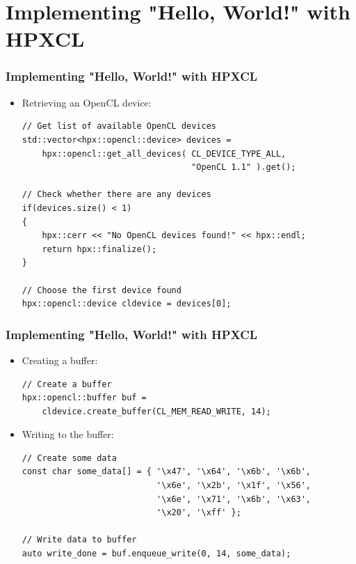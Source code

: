\documentclass{beamer}
\begin{document}

\section{Implementing "Hello, World!" with HPXCL}
\begin{frame}[fragile]
    \frametitle{Implementing "Hello, World!" with HPXCL}
    \begin{itemize}
        \item Retrieving an OpenCL device:
        \begin{lstlisting}[firstnumber=30]
// Get list of available OpenCL devices
std::vector<hpx::opencl::device> devices =
    hpx::opencl::get_all_devices( CL_DEVICE_TYPE_ALL,
                                  "OpenCL 1.1" ).get();

// Check whether there are any devices
if(devices.size() < 1)
{
    hpx::cerr << "No OpenCL devices found!" << hpx::endl;
    return hpx::finalize();
}

// Choose the first device found
hpx::opencl::device cldevice = devices[0];
        \end{lstlisting}
    \end{itemize}
\end{frame}

\begin{frame}[fragile]
    \frametitle{Implementing "Hello, World!" with HPXCL}
    \begin{itemize}
        \item Creating a buffer:
        \begin{lstlisting}[firstnumber=40]
// Create a buffer
hpx::opencl::buffer buf =
    cldevice.create_buffer(CL_MEM_READ_WRITE, 14);
        \end{lstlisting}
        \item Writing to the buffer:
        \begin{lstlisting}[firstnumber=44]
// Create some data
const char some_data[] = { '\x47', '\x64', '\x6b', '\x6b',
                           '\x6e', '\x2b', '\x1f', '\x56',
                           '\x6e', '\x71', '\x6b', '\x63',
                           '\x20', '\xff' };

// Write data to buffer
auto write_done = buf.enqueue_write(0, 14, some_data);
        \end{lstlisting}
    \end{itemize}
\end{frame}
\end{document}
